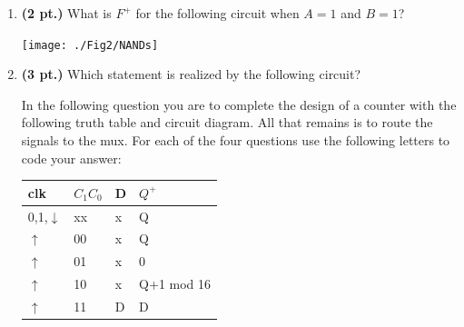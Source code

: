 \documentclass{article}
\begin{document}
\begin{enumerate}
\item {\bf (2 pt.)} What is $F^+$ for the following circuit when
$A=1$ and $B=1$?

\texttt{[image: ./Fig2/NANDs]}

\pagebreak{}

\item {\bf (3 pt.)} Which statement is realized by the following circuit?



In the following question you are to complete the design of a counter with
the following truth table and circuit diagram.  All that remains is to route
the signals to the mux.  For each of the four questions use the following
letters to code your answer:

\begin{tabular}{l|l|l||l}
clk         & $C_1 C_0$ & D & $Q^+$ \\ \hline \hline
0,1,$\downarrow$ & xx   & x & Q     \\ \hline
$\uparrow$     & 00     & x & Q     \\  \hline
$\uparrow$     & 01     & x & 0     \\  \hline
$\uparrow$     & 10     & x & Q+1 mod 16  \\  \hline
$\uparrow$     & 11     & D & D     \\
\end{tabular}


\end{enumerate}
\end{document}
